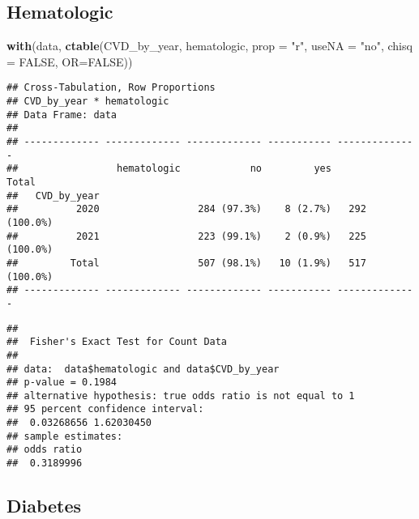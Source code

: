 \documentclass[
]{article}
\newenvironment{Shaded}{\begin{snugshade}}{\end{snugshade}}
\newcommand{\AttributeTok}[1]{\textcolor[rgb]{0.13,0.29,0.53}{#1}}
\newcommand{\ConstantTok}[1]{\textcolor[rgb]{0.56,0.35,0.01}{#1}}
\newcommand{\FunctionTok}[1]{\textcolor[rgb]{0.13,0.29,0.53}{\textbf{#1}}}
\newcommand{\NormalTok}[1]{#1}
\newcommand{\SpecialCharTok}[1]{\textcolor[rgb]{0.81,0.36,0.00}{\textbf{#1}}}
\newcommand{\StringTok}[1]{\textcolor[rgb]{0.31,0.60,0.02}{#1}}
\begin{document}
\hypertarget{hematologic}{%
\subsection{Hematologic}\label{hematologic}}

\begin{Shaded}
\begin{Highlighting}[]
\FunctionTok{with}\NormalTok{(data, }\FunctionTok{ctable}\NormalTok{(CVD\_by\_year, hematologic, }\AttributeTok{prop =} \StringTok{"r"}\NormalTok{, }\AttributeTok{useNA =} \StringTok{"no"}\NormalTok{, }\AttributeTok{chisq =} \ConstantTok{FALSE}\NormalTok{, }\AttributeTok{OR=}\ConstantTok{FALSE}\NormalTok{))}
\end{Highlighting}
\end{Shaded}

\begin{verbatim}
## Cross-Tabulation, Row Proportions  
## CVD_by_year * hematologic  
## Data Frame: data  
## 
## ------------- ------------- ------------- ----------- --------------
##                 hematologic            no         yes          Total
##   CVD_by_year                                                       
##          2020                 284 (97.3%)    8 (2.7%)   292 (100.0%)
##          2021                 223 (99.1%)    2 (0.9%)   225 (100.0%)
##         Total                 507 (98.1%)   10 (1.9%)   517 (100.0%)
## ------------- ------------- ------------- ----------- --------------
\end{verbatim}

\begin{Shaded}
\end{Shaded}

\begin{verbatim}
## 
##  Fisher's Exact Test for Count Data
## 
## data:  data$hematologic and data$CVD_by_year
## p-value = 0.1984
## alternative hypothesis: true odds ratio is not equal to 1
## 95 percent confidence interval:
##  0.03268656 1.62030450
## sample estimates:
## odds ratio 
##  0.3189996
\end{verbatim}

\hypertarget{diabetes}{%
\subsection{Diabetes}\label{diabetes}}
\end{document}
